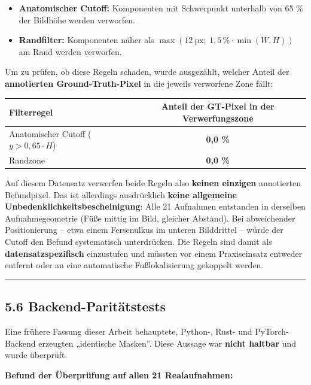 \documentclass[
  11pt,
]{article}
\newcounter{none} %
\providecommand{\tightlist}{%
  \setlength{\itemsep}{0pt}\setlength{\parskip}{0pt}}
\begin{document}
\begin{itemize}
\tightlist
\item
  \textbf{Anatomischer Cutoff:} Komponenten mit Schwerpunkt unterhalb
  von 65 \% der Bildhöhe werden verworfen.
\item
  \textbf{Randfilter:} Komponenten näher als
  \(\max(12\ \text{px};\ 1{,}5\,\%\cdot\min(W,H))\) am Rand werden
  verworfen.
\end{itemize}

Um zu prüfen, ob diese Regeln schaden, wurde ausgezählt, welcher Anteil
der \textbf{annotierten Ground-Truth-Pixel} in die jeweils verworfene
Zone fällt:

{\def\LTcaptype{none} %
\begin{longtable}[]{@{}lc@{}}
\toprule\noalign{}
Filterregel & Anteil der GT-Pixel in der Verwerfungszone \\
\midrule\noalign{}
\endhead
\bottomrule\noalign{}
\endlastfoot
Anatomischer Cutoff (\(y > 0{,}65 \cdot H\)) & \textbf{0,0 \%} \\
Randzone & \textbf{0,0 \%} \\
\end{longtable}
}

Auf diesem Datensatz verwerfen beide Regeln also \textbf{keinen
einzigen} annotierten Befundpixel. Das ist allerdings ausdrücklich
\textbf{keine allgemeine Unbedenklichkeits\-bescheinigung}: Alle 21
Aufnahmen entstanden in derselben Aufnahmegeometrie (Füße mittig im
Bild, gleicher Abstand). Bei abweichender Positionierung -- etwa einem
Fersenulkus im unteren Bilddrittel -- würde der Cutoff den Befund
systematisch unterdrücken. Die Regeln sind damit als
\textbf{datensatzspezifisch} einzustufen und müssten vor einem
Praxiseinsatz entweder entfernt oder an eine automatische
Fußlokalisierung gekoppelt werden.

\begin{center}\rule{0.5\linewidth}{0.5pt}\end{center}

\subsection{5.6 Backend-Paritätstests}\label{backend-parituxe4tstests}

Eine frühere Fassung dieser Arbeit behauptete, Python-, Rust- und
PyTorch-Backend erzeugten „identische Masken''. Diese Aussage war
\textbf{nicht haltbar} und wurde überprüft.

\textbf{Befund der Überprüfung auf allen 21 Realaufnahmen:}
\end{document}
